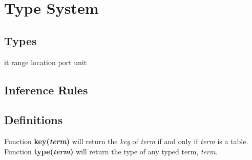 \documentclass{article}
\begin{document}
\section{Type System}
  \subsection{Types}
  it\newline
  range\newline
  location\newline
  port\newline
  unit\newline
  \subsection{Inference Rules}
  \subsection*{Definitions}
  Function \textbf{key(\textit{term})} will return the \textit{key} of \textit{term} if and only if \textit{term} is a table. \newline
  Function \textbf{type(\textit{term})} will return the type of any typed term, \textit{term}.
\end{document}
